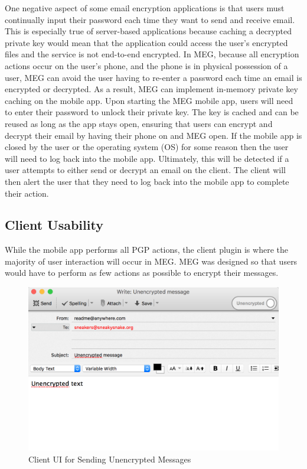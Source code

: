 \documentclass[10pt]{article}
\begin{document}
\begin{multicols}{2}
\par One negative aspect of some email encryption applications is that users must continually input their password each time they want to send and receive email. This is especially true of server-based applications because caching a decrypted private key would mean that the application could access the user's encrypted files and the service is not end-to-end encrypted. In MEG, because all encryption actions occur on the user's phone, and the phone is in physical possession of a user, MEG can avoid the user having to re-enter a password each time an email is encrypted or decrypted. As a result, MEG can implement  in-memory private key caching on the mobile app. Upon starting the MEG mobile app, users will need to enter their password to unlock their private key. The key is cached and can be reused as long as the app stays open, ensuring that users can encrypt and decrypt their email by having their phone on and MEG open. If the mobile app is closed by the user or the operating system (OS) for some reason then the user will need to log back into the mobile app. Ultimately, this will be detected if a user attempts to either send or decrypt an email on the client. The client will then alert the user that they need to log back into the mobile app to complete their action.
\subsection{Client Usability}
\par While the mobile app performs all PGP actions, the client plugin is where the majority of user interaction will occur in MEG. MEG was designed so that users would have to perform as few actions as possible to encrypt their messages.
\end{multicols}
\begin{figure}[h]
    \centering
    \includegraphics[scale=.5]{unencrypted-client-ui.png}
    \caption{Client UI for Sending Unencrypted Messages}
    \label{fig:unencrypted-ui}
\end{figure}
\end{document}
